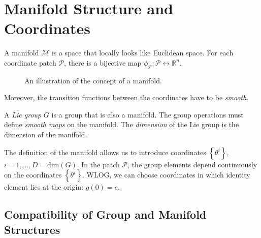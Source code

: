 \section{Manifold Structure and Coordinates}%
\label{sec:definitions}

\begin{definition}[Manifold]
  A manifold $\mathcal{M}$ is a space that locally looks like Euclidean space. For each coordinate patch $\mathcal{P}$, there is a bijective map $\phi_\mathcal{P}\colon \mathcal{P} \leftrightarrow \mathbb{R}^n$. 
  \begin{figure}[htbp]
    \centering
    \def\svgwidth{0.6\columnwidth}
    
    \caption{An illustration of the concept of a manifold.}
    \label{fig:manifold}
  \end{figure}
  Moreover, the transition functions between the coordinates have to be \emph{smooth}.
\end{definition}

\begin{definition}
  A \emph{Lie group} $G$ is a group that is also a manifold. The group operations must define \emph{smooth maps} on the manifold.
  The \emph{dimension} of the Lie group is the dimension of the manifold.
\end{definition}

The definition of the manifold allows us to introduce coordinates $\left\{ \theta^i \right\}$, $i = 1, \dots, D = \text{dim}(G)$.
In the patch $\mathcal{P}$, the group elements depend continuously on the coordinates $\left\{ \theta^i \right\}$.
WLOG, we can choose coordinates in which identity element lies at the origin: $g(0) = e$.

\subsection{Compatibility of Group and Manifold Structures}%

